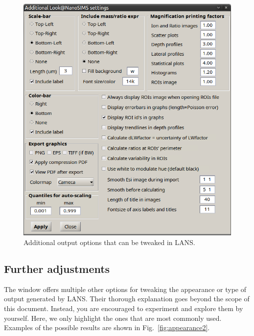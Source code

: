 \begin{figure}[!t]
\centering
\includegraphics[scale=0.45]{figs1/LANS-tweaking}
\caption{\label{fig:appearance}%
Additional output options that can be tweaked in LANS.}
\end{figure}

\subsection{Further adjustments}
\label{sec:appearance1}

\goldbox{}
The  window offers multiple other options for tweaking the appearance or type of output generated by LANS. Their thorough explanation goes beyond the scope of this document. Instead, you are encouraged to experiment and explore them by yourself. Here, we only highlight the ones that are most commonly used. Examples of the possible results are shown in Fig.~\ref{fig:appearance2}.
\tcbe


